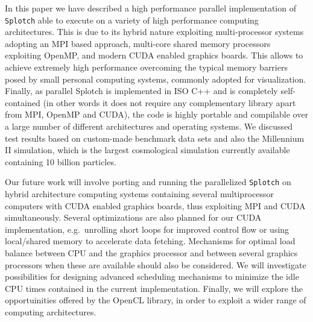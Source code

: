 \documentclass[1p,times]{elsarticle}
\begin{document}

In this paper we have described a high performance parallel implementation of {\tt Splotch} 
able to execute on a variety of high performance computing architectures. This is due 
to its hybrid nature exploiting multi-processor systems adopting an MPI based approach,
multi-core shared memory processors exploiting OpenMP, and modern CUDA enabled graphics 
boards. This allows to achieve extremely high performance overcoming the typical memory 
barriers posed by small personal computing systems, commonly adopted for visualization. 
Finally, as parallel Splotch is implemented in ISO C++ and is completely self-contained
(in other words it does not require any complementary library apart from MPI, OpenMP and CUDA), 
the code is highly portable and compilable over a large number of different 
architectures and operating systems. We discussed test results based on 
custom-made benchmark data sets and also the Millennium II simulation, which is the
largest cosmological simulation currently available containing 10 billion particles.

Our future work will involve porting and running the parallelized {\tt Splotch} on hybrid 
architecture computing systems containing several multiprocessor computers with CUDA 
enabled graphics boards, thus exploiting MPI and CUDA simultaneously. 
Several optimizations are also planned for our CUDA implementation, e.g.\ unrolling 
short loops for improved control flow or using local/shared memory to accelerate data fetching. 
Mechanisms for optimal load balance between CPU and the graphics processor and between several 
graphics processors when these are available should also be considered. We will 
investigate possibilities for designing advanced scheduling mechanisms to minimize 
the idle CPU times contained in the current implementation. Finally, we will explore the 
opportuinities offered by the OpenCL library, in order to exploit a wider range of 
computing architectures. 
\end{document}
